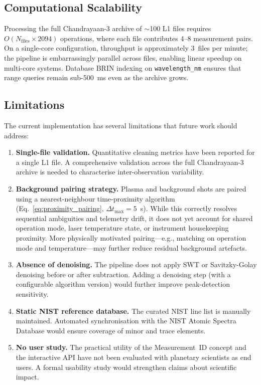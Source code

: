 \documentclass[a4paper,twocolumn,10pt]{article}
\begin{document}
\subsection{Computational Scalability}

Processing the full Chandrayaan-3 archive of $\sim$100 L1 files
requires $O(N_{\text{files}} \times 2094)$ operations, where each
file contributes 4--8 measurement pairs.  On a single-core
configuration, throughput is approximately 3~files per minute;
the pipeline is embarrassingly parallel across files, enabling
linear speedup on multi-core systems.  Database BRIN indexing
on \texttt{wavelength\_nm} ensures that range queries remain
sub-\SI{500}{\milli\second} even as the archive grows.

\subsection{Limitations}

The current implementation has several limitations that future work
should address:

\begin{enumerate}[nosep,leftmargin=*]
  \item \textbf{Single-file validation.}  Quantitative cleaning
    metrics have been reported for a single L1 file.  A comprehensive
    validation across the full Chandrayaan-3 archive is needed to
    characterise inter-observation variability.

  \item \textbf{Background pairing strategy.}  Plasma and background
    shots are paired using a nearest-neighbour time-proximity algorithm
    (Eq.~\ref{eq:proximity_pairing}, $\Delta t_{\text{max}} = 5$~s).
    While this correctly resolves sequential ambiguities and telemetry
    drift, it does not yet account for shared operation mode, laser
    temperature state, or instrument housekeeping proximity.  More
    physically motivated pairing---e.g., matching on operation mode
    and temperature---may further reduce residual background artefacts.

  \item \textbf{Absence of denoising.}  The pipeline does not apply
    SWT or Savitzky-Golay denoising before or after subtraction.
    Adding a denoising step (with a configurable algorithm version)
    would further improve peak-detection sensitivity.

  \item \textbf{Static NIST reference database.}  The curated NIST
    line list is manually maintained.  Automated synchronisation with
    the NIST Atomic Spectra Database would ensure coverage of minor
    and trace elements.

  \item \textbf{No user study.}  The practical utility of the
    Measurement~ID concept and the interactive API have not been
    evaluated with planetary scientists as end users.  A formal
    usability study would strengthen claims about scientific impact.
\end{enumerate}
\end{document}

